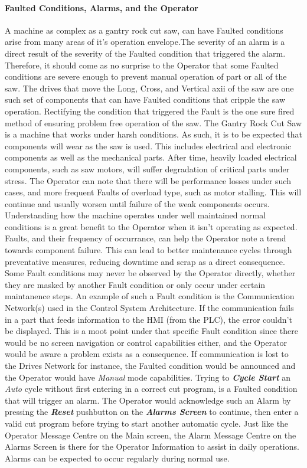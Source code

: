 \paragraph*{Faulted Conditions, Alarms, and the Operator} A machine as complex as a gantry rock cut saw, can have Faulted conditions arise from many areas of it's operation envelope.The severity of an alarm is a direct result of the severity of the Faulted condition that triggered the alarm. Therefore, it should come as no surprise to the Operator that some Faulted conditions are severe enough to prevent manual operation of part or all of the saw. The drives that move the Long, Cross, and Vertical axii of the saw are one such set of components that can have Faulted conditions that cripple the saw operation. Rectifying the condition that triggered the Fault is the one sure fired method of ensuring problem free operation of the saw. The Gantry Rock Cut Saw is a machine that works under harsh conditions. As such, it is to be expected that components will wear as the saw is used. This includes electrical and electronic components as well as the mechanical parts. After time, heavily loaded electrical components, such as saw motors, will suffer degradation of critical parts under stress. The Operator can note that there will be performance losses under such cases, and more frequent Faults of overload type, such as motor stalling. This will continue and usually worsen until failure of the weak components occurs. Understanding how the machine operates under well maintained normal conditions is a great benefit to the Operator when it isn't operating as expected. Faults, and their frequency of occurrance, can help the Operator note a trend towards component failure. This can lead to better maintenance cycles through preventative measures, reducing downtime and scrap as a direct consequence. Some Fault conditions may never be observed by the Operator directly, whether they are masked by another Fault condition or only occur under certain maintanence steps. An example of such a Fault condition is the Communication Network(s) used in the Control System Architecture. If the communication fails in a part that feeds information to the HMI (from the PLC), the error couldn't be displayed. This is a moot point under that specific Fault condition since there would be no screen navigation or control capabilities either, and the Operator would be aware a problem exists as a consequence. If communication is lost to the Drives Network for instance, the Faulted condition would be announced and the Operator would have \textit{Manual} mode capabilities. Trying to \textbf{\textit{Cycle Start}} an \textit{Auto} cycle without first entering in a correct cut program, is a Faulted condition that will trigger an alarm. The Operator would acknowledge such an Alarm by pressing the \textbf{\textit{Reset}} pushbutton on the \textbf{\textit{Alarms Screen}} to continue, then enter a valid cut program before trying to start another automatic cycle. Just like the Operator Message Centre on the Main screen, the Alarm Message Centre on the Alarms Screen is there for the Operator Information to assist in daily operations. Alarms can be expected to occur regularly during normal use. 
